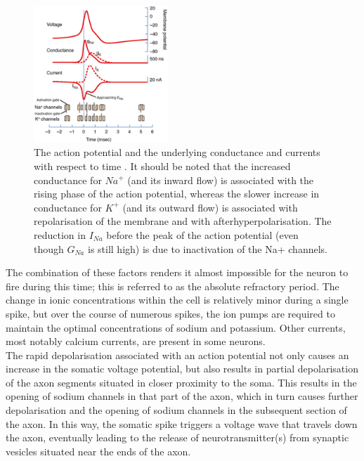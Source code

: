 \begin{figure}[htbp!] 
    \centering    
    \includegraphics[width=0.45\textwidth]{Chapter2/Figs/b.png}
    \caption[Spiking dynamics of a neuron.]{The action potential and the underlying conductance and currents with respect to time \cite{squire2012fundamental}. It should be noted that the increased conductance for $Na^+$ (and its inward flow) is associated with the rising phase of the action potential, whereas the slower increase in conductance for $K^+$ (and its outward flow) is associated with repolarisation of the membrane and with afterhyperpolarisation. The reduction in $I_{Na}$ before the peak of the action potential (even though $G_{Na}$ is still high) is due to inactivation of the Na+ channels.}
    \label{fig:2b}
\end{figure}

\noindent The combination of these factors renders it almost impossible for the neuron to fire during this time; this is referred to as the absolute refractory period. The change in ionic concentrations within the cell is relatively minor during a single spike, but over the course of numerous spikes, the ion pumps are required to maintain the optimal concentrations of sodium and potassium. Other currents, most notably calcium currents, are present in some neurons. \\

\noindent The rapid depolarisation associated with an action potential not only causes an increase in the somatic voltage potential, but also results in partial depolarisation of the axon segments situated in closer proximity to the soma. This results in the opening of sodium channels in that part of the axon, which in turn causes further depolarisation and the opening of sodium channels in the subsequent section of the axon. In this way, the somatic spike triggers a voltage wave that travels down the axon, eventually leading to the release of neurotransmitter(s) from synaptic vesicles situated near the ends of the axon. \\

